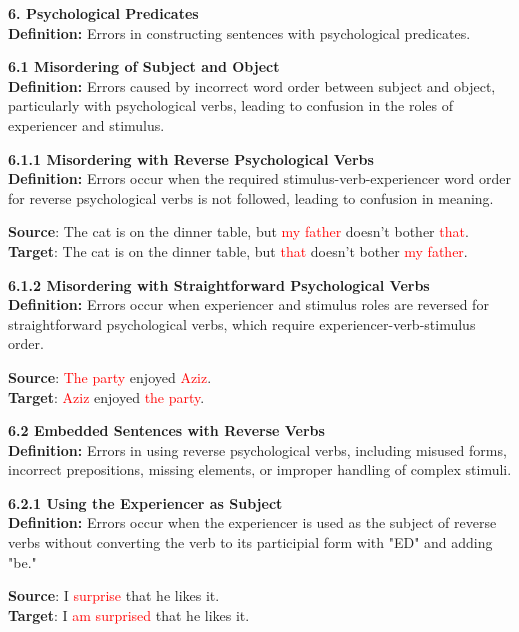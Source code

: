 \begin{tcolorbox}[breakable]
\noindent \textbf{6. Psychological Predicates}\\
\textbf{Definition:} Errors in constructing sentences with psychological predicates.

\noindent \textbf{6.1 Misordering of Subject and Object}\\
\textbf{Definition:} Errors caused by incorrect word order between subject and object, particularly with psychological verbs, leading to confusion in the roles of experiencer and stimulus.

\noindent \textbf{6.1.1 Misordering with Reverse Psychological Verbs}\\
\textbf{Definition:} Errors occur when the required stimulus-verb-experiencer word order for reverse psychological verbs is not followed, leading to confusion in meaning.


\textbf{Source}: The cat is on the dinner table, but \textcolor{red}{my father} doesn’t bother \textcolor{red}{that}. \\
\textbf{Target}: The cat is on the dinner table, but \textcolor{red}{that} doesn’t bother \textcolor{red}{my father}.


\noindent \textbf{6.1.2 Misordering with Straightforward Psychological Verbs}\\
\textbf{Definition:} Errors occur when experiencer and stimulus roles are reversed for straightforward psychological verbs, which require experiencer-verb-stimulus order.


\textbf{Source}: \textcolor{red}{The party} enjoyed \textcolor{red}{Aziz}. \\
\textbf{Target}: \textcolor{red}{Aziz} enjoyed \textcolor{red}{the party}.


\noindent \textbf{6.2 Embedded Sentences with Reverse Verbs}\\
\textbf{Definition:} Errors in using reverse psychological verbs, including misused forms, incorrect prepositions, missing elements, or improper handling of complex stimuli.

\noindent \textbf{6.2.1 Using the Experiencer as Subject}\\
\textbf{Definition:} Errors occur when the experiencer is used as the subject of reverse verbs without converting the verb to its participial form with "ED" and adding "be."


\textbf{Source}: I \textcolor{red}{surprise} that he likes it. \\
\textbf{Target}: I \textcolor{red}{am surprised} that he likes it.



\end{tcolorbox}

